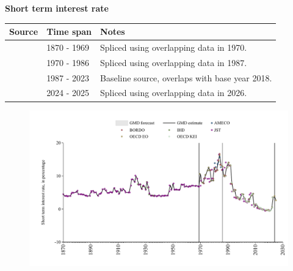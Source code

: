 \documentclass[12pt,a4paper,landscape]{article}
\begin{document}
\begin{adjustbox}{max totalsize={\paperwidth}{\paperheight},center}
\begin{minipage}[t][\textheight][t]{\textwidth}
\vspace*{0.5cm}
{}
\begin{center}
{\Large\bfseries Short term interest rate}
\end{center}
\vspace{0.5cm}
\begin{table}[H]
\centering
\small
\begin{tabular}{|l|l|l|}
\hline
\textbf{Source} & \textbf{Time span} & \textbf{Notes} \\
\hline
\rowcolor{white}\cite{JST}& 1870 - 1969 &Spliced using overlapping data in 1970. \\
\rowcolor{lightgray}\cite{OECD_EO}& 1970 - 1986 &Spliced using overlapping data in 1987. \\
\rowcolor{white}\cite{OECD_KEI}& 1987 - 2023 &Baseline source, overlaps with base year 2018. \\
\rowcolor{lightgray}\cite{OECD_EO}& 2024 - 2025 &Spliced using overlapping data in 2026. \\
\hline
\end{tabular}
\end{table}
\begin{figure}[H]
\centering
\includegraphics[width=\textwidth,height=0.6\textheight,keepaspectratio]{graphs/FIN_strate.pdf}
\end{figure}
\end{minipage}
\end{adjustbox}
\end{document}
